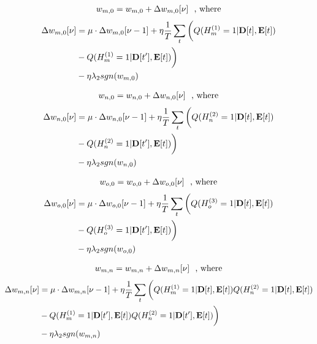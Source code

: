 \begin{align*}
w_{m, 0} = w_{m, 0} + \Delta w_{m, 0}[\nu]  \textrm{\,\,\,\,, where}
\end{align*}
\begin{align*}
\Delta w_{m, 0}[\nu] &= \mu \cdot \Delta w_{m, 0}[\nu-1] + \eta \frac{1}{T}\sum\limits_t  \bigg( Q( H_m^{(1)} = 1 | \mathbf{D}[t], \mathbf{E}[t] ) \\
& - Q( H_m^{(1)} = 1 | \mathbf{D}[t'], \mathbf{E}[t] ) \bigg) \\
& - \eta \lambda_2 sgn( w_{m, 0} )  \\
\end{align*}

\begin{align*}
w_{n, 0} = w_{n, 0} + \Delta w_{n, 0}[\nu] \textrm{\,\,\,\,, where}
\end{align*}
\begin{align*}
\Delta w_{n, 0}[\nu] &= \mu \cdot \Delta w_{n, 0}[\nu-1] + \eta \frac{1}{T}\sum\limits_t  \bigg( Q( H_n^{(2)} = 1 | \mathbf{D}[t], \mathbf{E}[t] ) \\
& - Q( H_n^{(2)} = 1 | \mathbf{D}[t'], \mathbf{E}[t] ) \bigg)  \\
& - \eta \lambda_2 sgn( w_{n, 0} ) \\
\end{align*}

\begin{align*}
w_{o, 0} = w_{o, 0} + \Delta w_{o, 0}[\nu] \textrm{\,\,\,\,, where}
\end{align*}
\begin{align*}
\Delta w_{o, 0}[\nu] &= \mu \cdot \Delta w_{o, 0}[\nu-1]  + \eta \frac{1}{T}\sum\limits_t  \bigg( Q( H_o^{(3)} = 1 | \mathbf{D}[t], \mathbf{E}[t] ) \\
& - Q( H_o^{(3)} = 1 | \mathbf{D}[t'], \mathbf{E}[t]) \bigg) \\
& - \eta \lambda_2 sgn( w_{o, 0} ) \\
\end{align*}


\begin{align*}
w_{m, n} = w_{m, n} + \Delta w_{m, n}[\nu] \textrm{\,\,\,\,, where}
\end{align*}
\begin{align*}
\Delta w_{m, n}[\nu] & = \mu \cdot  \Delta w_{m, n}[\nu-1]  + \eta \frac{1}{T}\sum\limits_t  \bigg( Q( H_m^{(1)} = 1 | \mathbf{D}[t], \mathbf{E}[t] ) Q( H_n^{(2)} = 1 | \mathbf{D}[t], \mathbf{E}[t] )\\
										   & - Q( H_m^{(1)} = 1 | \mathbf{D}[t'], \mathbf{E}[t] ) Q( H_n^{(2)} = 1 | \mathbf{D}[t'], \mathbf{E}[t]) \bigg)  \\
										   & - \eta \lambda_2 sgn( w_{m, n} ) \\
\end{align*}


